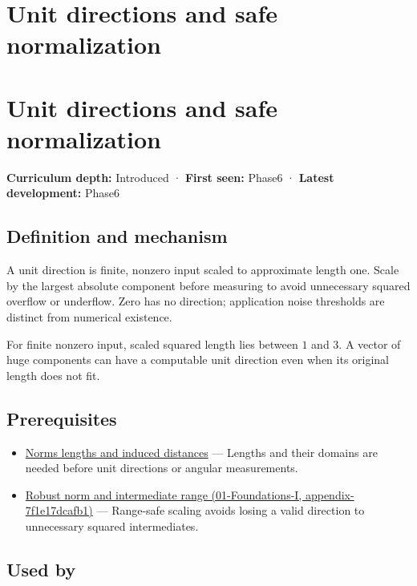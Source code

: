 \hypertarget{appendix-f744e41b95b4}{}
\section*{Unit directions and safe normalization}
\section{Unit directions and safe normalization}\label{appendix-f744e41b95b4-unit-directions-and-safe-normalization}

\textbf{Curriculum depth:} Introduced · \textbf{First seen:} Phase6 · \textbf{Latest development:} Phase6

\subsection{Definition and mechanism}\label{appendix-f744e41b95b4-definition-and-mechanism}

A unit direction is finite, nonzero input scaled to approximate length one. Scale by the largest absolute component before measuring to avoid unnecessary squared overflow or underflow. Zero has no direction; application noise thresholds are distinct from numerical existence.

For finite nonzero input, scaled squared length lies between \(1\) and \(3\). A vector of huge components can have a computable unit direction even when its original length does not fit.

\subsection{Prerequisites}\label{appendix-f744e41b95b4-prerequisites}

\begin{itemize}
\tightlist
\item
  \hyperref[appendix-49933872bb51]{Norms lengths and induced distances} --- Lengths and their domains are needed before unit directions or angular measurements.
\item
  \href{../01-Foundations-I/main.pdf\#nameddest=appendix-7f1e17dcafb1}{Robust norm and intermediate range (01-Foundations-I, appendix-7f1e17dcafb1)} --- Range-safe scaling avoids losing a valid direction to unnecessary squared intermediates.
\end{itemize}

\subsection{Used by}\label{appendix-f744e41b95b4-used-by}

